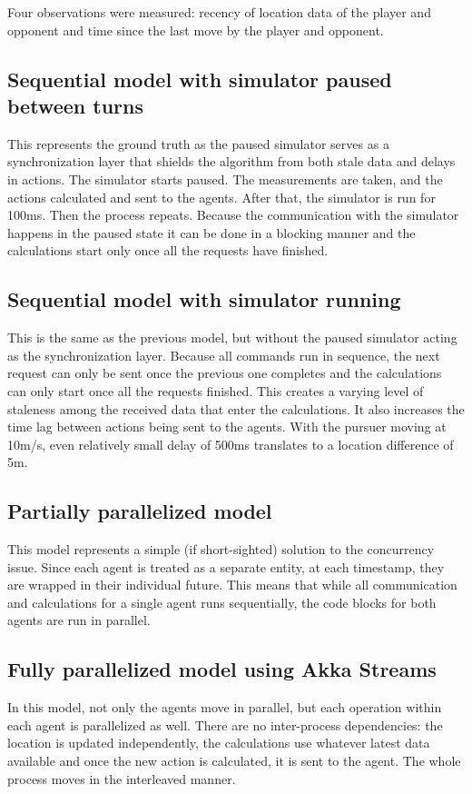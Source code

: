\documentclass{article}
\begin{document}
Four observations were measured: recency of location data of the player and opponent and time since the last move by the player and opponent.

\subsection{Sequential model with simulator paused between turns}
This represents the ground truth as the paused simulator serves as a synchronization layer that shields the algorithm from both stale data and delays in actions. The simulator starts paused. The measurements are taken, and the actions calculated and sent to the agents. After that, the simulator is run for 100ms. Then the process repeats. Because the communication with the simulator happens in the paused state it can be done in a blocking manner and the calculations start only once all the requests have finished.

\subsection{Sequential model with simulator running}
This is the same as the previous model, but without the paused simulator acting as the synchronization layer. Because all commands run in sequence, the next request can only be sent once the previous one completes and the calculations can only start once all the requests finished. This creates a varying level of staleness among the received data that enter the calculations. It also increases the time lag between actions being sent to the agents. With the pursuer moving at 10m/s, even relatively small delay of 500ms translates to a location difference of 5m.

\subsection{Partially parallelized model}
This model represents a simple (if short-sighted) solution to the concurrency issue. Since each agent is treated as a separate entity, at each timestamp, they are wrapped in their individual future. This means that while all communication and calculations for a single agent runs sequentially, the code blocks for both agents are run in parallel.

\subsection{Fully parallelized model using Akka Streams}
In this model, not only the agents move in parallel, but each operation within each agent is parallelized as well. There are no inter-process dependencies: the location is updated independently, the calculations use whatever latest data available and once the new action is calculated, it is sent to the agent. The whole process moves in the interleaved manner.
\end{document}
